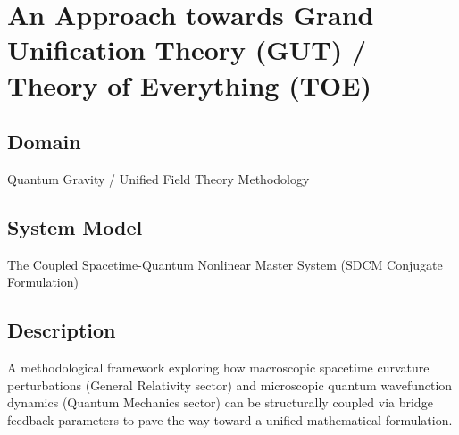 \chapter{An Approach towards Grand Unification Theory (GUT) / Theory of Everything (TOE)}

\section{Domain}
Quantum Gravity / Unified Field Theory Methodology

\section{System Model}
The Coupled Spacetime-Quantum Nonlinear Master System (SDCM Conjugate Formulation)

\section{Description}
A methodological framework exploring how macroscopic spacetime curvature perturbations (General Relativity sector) and microscopic quantum wavefunction dynamics (Quantum Mechanics sector) can be structurally coupled via bridge feedback parameters to pave the way toward a unified mathematical formulation.

